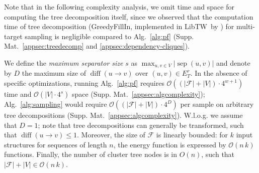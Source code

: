 \documentclass{bioinfo}
\newcommand{\separator}[2]{\operatorname{sep}(#1,#2)}
\newcommand{\difference}[2]{\operatorname{diff}(#1 \rightarrow #2)}
\newcommand{\F}{\mathcal{F}}
\newcommand{\edgesToR}{E^r_T}
\newcommand{\Software}[1]{{\ttfamily #1}}
\begin{document}
Note that in the following complexity analysis, we omit time and space for computing the
tree decomposition itself, since we observed that the computation time
of tree decomposition (\Software{GreedyFillIn}, implemented in
\Software{LibTW}~by \citet{Dijk2006}) for multi-target sampling is
negligible compared to Alg.~\ref{alg:pf}
(Supp. Mat.~\ref{appsec:treedecomp} and
\ref{appsec:dependency-cliques}).

We define the \emph{maximum separator size} $s$ as
$\max_{u,v\in V} | \separator{u}{v} |$ and denote by  $D$ the maximum size of
$\difference{u}{v}$ over $(u,v)\in\edgesToR{}$.  In the absence
of specific optimizations, running Alg.~\ref{alg:pf} requires
$\mathcal{O}((|\F|+|V|)\cdot 4^{w+1})$ time and
$\mathcal{O}(|V|\cdot4^s)$ space
(Supp. Mat.~\ref{appsec:algcomplexity}); Alg.~\ref{alg:sampling} would
require $\mathcal{O}((|\F|+|V|)\cdot 4^D)$ per sample on arbitrary
tree decompositions
(Supp. Mat.~\ref{appsec:algcomplexity}). W.l.o.g. we assume that
$D=1$; note that tree decompositions can generally be transformed,
such that $\difference{u}{v}\leq 1$.
%
Moreover, the size of $\F$ is linearly bounded: for $k$
input structures for sequences of length $n$, the energy function is
expressed by $\mathcal{O}(n\,k)$ functions. Finally, the number of cluster
tree nodes is in $O(n)$, such that $|\F|+|V| \in \mathcal{O}(n\,k)$.
\end{document}
